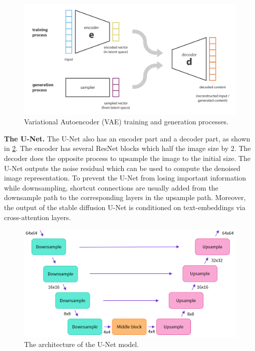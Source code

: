 \begin{figure}[ht]
    \centering
    \includegraphics[width=\linewidth]{images/diffusion/vae.png}
    \caption{Variational Autoencoder (VAE) training and generation processes.}
    \label{fig:vae}
\end{figure}

\textbf{The U-Net.} The U-Net \cite{ronneberger2015u} also has an encoder part and a decoder part, as shown in \cref{fig:unet_model}. The encoder has several ResNet blocks which half the image size by 2. The decoder does the opposite process to upsample the image to the initial size. The U-Net outputs the noise residual which can be used to compute the denoised image representation. To prevent the U-Net from losing important information while downsampling, shortcut connections are usually added from the downsample path to the corresponding layers in the upsample path. Moreover, the output of the stable diffusion U-Net is conditioned on text-embeddings via cross-attention layers.

\begin{figure}[ht]
    \centering
    \includegraphics[width=\linewidth]{images/diffusion/unet-model.png}
    \caption{The architecture of the U-Net model.}
    \label{fig:unet_model}
\end{figure}

